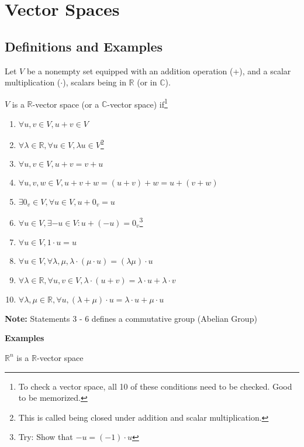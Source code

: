 \chapter{Vector Spaces}

\section{Definitions and Examples}

\begin{definition}
	Let $V$ be a nonempty set equipped with an addition operation (+), and a scalar multiplication ($\cdot$), scalars being in $\mathbb{R}$ (or in $\mathbb{C}$).

	$V$ is a $\mathbb{R}$-vector space (or a $\mathbb{C}$-vector space) if\footnote{To check a vector space, all 10 of these conditions need to be checked. Good to be memorized.}

	\begin{enumerate}[1.]
		\item $\forall u, v \in V, u + v \in V$
		\item $\forall \lambda \in \mathbb{R}, \forall u \in V, \lambda u \in V$\footnote{This is called being closed under addition and scalar multiplication.}
		\item $\forall u, v \in V, u+v=v+u$
		\item $\forall u,v,w \in V, u+v+w=(u+v)+w=u+(v+w)$
		\item $\exists 0_v \in V, \forall u \in V, u + 0_v = u$
		\item $\forall u \in V, \exists -u \in V : u + (-u) = 0_v$\footnote{Try: Show that $-u = (-1) \cdot u$}
		\item $\forall u \in V, 1 \cdot u = u$
		\item $\forall u \in V, \forall \lambda, \mu, \lambda \cdot (\mu \cdot u) = (\lambda \mu) \cdot u$
		\item $\forall \lambda \in \mathbb{R},  \forall u, v \in V,  \lambda \cdot (u + v) = \lambda \cdot u + \lambda \cdot v$
		\item $\forall \lambda, \mu \in \mathbb{R}, \forall u,  (\lambda + \mu) \cdot u = \lambda \cdot u + \mu \cdot u$
	\end{enumerate}

	\textbf{Note:} Statements 3 - 6 defines a commutative group (Abelian Group)
\end{definition}

\textbf{Examples}

\begin{example}
	$\mathbb{R}^n$ is a $\mathbb{R}$-vector space
\end{example}

